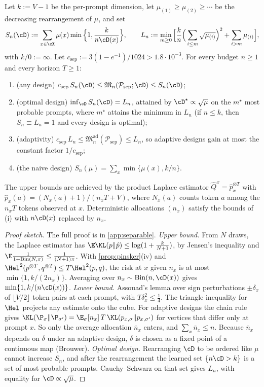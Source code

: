 \begin{theorem}\label{thm:separable}
\Pv\Ck Let $k:=V-1$ be the per-prompt dimension, let $\mu_{(1)}\ge\mu_{(2)}\ge\cdots$ be the decreasing
rearrangement of $\mu$, and set
\[
S_n(\cD):=\sum_{x\in\cX}\mu(x)\min\Big\{1,\frac k{n\cD(x)}\Big\},\qquad
L_n:=\min_{m\ge0}\Big[\frac kn\Big(\sum_{i\le m}\sqrt{\mu_{(i)}}\Big)^2+\sum_{i>m}\mu_{(i)}\Big],
\]
with $k/0:=\infty$. Let $c_{\mathrm{sep}}:=3(1-e^{-1})/1024>1.8\cdot10^{-3}$. For every budget $n\ge1$ and every
horizon $T\ge1$:
\begin{enumerate}[label=(\roman*),nosep]
\item (any design) $c_{\mathrm{sep}}\,S_n(\cD)\le\mathfrak M_n(\mathcal P_{\mathrm{sep}};\cD)\le S_n(\cD)$;
\item (optimal design) $\inf_\cD S_n(\cD)=L_n$, attained by $\cD^\star\propto\sqrt\mu$ on the $m^\star$ most probable
prompts, where $m^\star$ attains the minimum in $L_n$ (if $n\le k$, then $S_n\equiv L_n=1$ and every design is
optimal);
\item (adaptivity) $c_{\mathrm{sep}}\,L_n\le\mathfrak M^{\mathrm{ad}}_n(\mathcal P_{\mathrm{sep}})\le L_n$, so adaptive
designs gain at most the constant factor $1/c_{\mathrm{sep}}$;
\item (the naive design) $S_n(\mu)=\sum_x\min\{\mu(x),k/n\}$.
\end{enumerate}
The upper bounds are achieved by the product Laplace estimator $\hat Q^x=\hat p_x^{\otimes T}$ with
$\hat p_x(a)=(N_x(a)+1)/(n_xT+V)$, where $N_x(a)$ counts token $a$ among the $n_xT$ tokens observed at $x$.
Deterministic allocations $(n_x)$ satisfy the bounds of (i) with $n\cD(x)$ replaced by $n_x$.
\end{theorem}
\begin{proof}[Proof sketch]
The full proof is in \cref{app:separable}.
\emph{Upper bound.} From $N$ draws, the Laplace estimator has $\E\KL(p\|\hat p)\le\log(1+\frac k{N+1})$, by
Jensen's inequality and $\E\frac1{1+\mathrm{Bin}(N,\pi)}\le\frac1{(N+1)\pi}$. With \cref{prop:pinsker}(iv) and
$\Hel^2(p^{\otimes T},q^{\otimes T})\le T\Hel^2(p,q)$, the risk at $x$ given $n_x$ is at most $\min\{1,k/(2n_x)\}$.
Averaging over $n_x\sim\mathrm{Bin}(n,\cD(x))$ gives $\min\{1,k/(n\cD(x))\}$.
\emph{Lower bound.} Assouad's lemma over sign perturbations $\pm\delta_x$ of $\lfloor V/2\rfloor$ token pairs at
each prompt, with $T\delta_x^2\le\frac14$. The triangle inequality for $\Hel$ projects any estimate onto the
cube. For adaptive designs the chain rule gives
$\KL(\P_\sigma\|\P_{\sigma'})=\E_\sigma[n_x]\,T\,\KL(p_{x,\sigma}\|p_{x,\sigma'})$ for vertices that differ only at prompt
$x$. So only the average allocation $\bar n_x$ enters, and $\sum_x\bar n_x\le n$. Because $\bar n_x$ depends on
$\delta$ under an adaptive design, $\delta$ is chosen as a fixed point of a continuous map (Brouwer).
\emph{Optimal design.} Rearranging $\cD$ to be ordered like $\mu$ cannot increase $S_n$, and after the
rearrangement the learned set $\{n\cD>k\}$ is a set of most probable prompts. Cauchy--Schwarz on
that set gives $L_n$, with equality for $\cD\propto\sqrt\mu$.
\end{proof}

